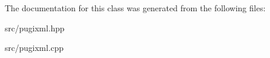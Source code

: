 The documentation for this class was generated from the following files\+:\begin{DoxyCompactItemize}
\item 
src/pugixml.\+hpp\item 
src/pugixml.\+cpp\end{DoxyCompactItemize}
